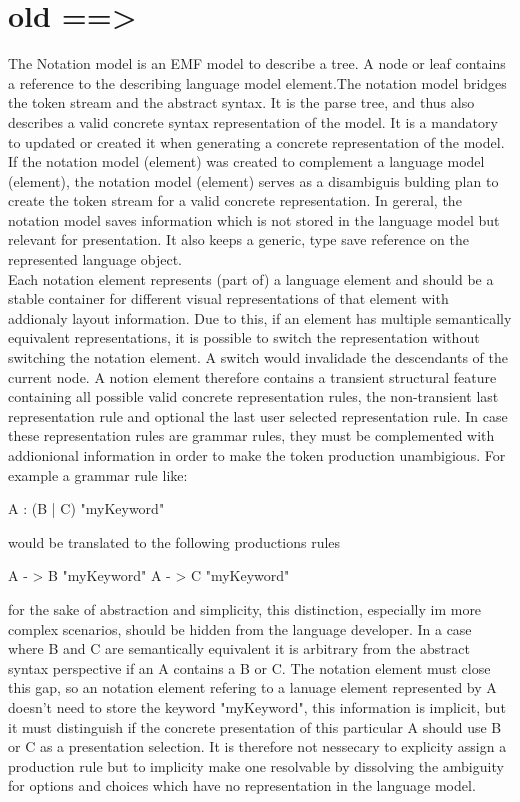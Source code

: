 \section{old ==>}
The Notation model is an EMF model to describe a tree. A node or leaf contains a reference to the describing language model element.The notation model bridges the token stream and the abstract syntax. It is the parse tree, and thus also describes a valid concrete syntax representation of the model.  It is a mandatory to updated or created it when generating a concrete representation of the model. If the notation model (element) was created to complement a language model (element), the notation model (element) serves as a disambiguis bulding plan to create the token stream for a valid concrete representation. In gereral, the notation model saves information which is not stored in the language model but relevant for presentation. It also keeps a generic, type save reference on the represented language object.\\
Each notation element represents (part of) a language element and should be a stable container for different visual representations of that element with addionaly layout information.  Due to this, if an element has multiple semantically equivalent representations, it is possible to switch the representation without switching the notation element. A switch would invalidade the descendants of the current node. A notion element therefore contains a transient structural feature containing all possible valid concrete representation rules, the non-transient last representation rule and optional the last user selected representation rule. In case these representation rules are grammar rules, they must be complemented with addionional information in order to make the token production unambigious. For example a grammar rule like:
\begin{xtxt}
A : (B | C) "myKeyword"
\end{xtxt}
would be translated to the following productions rules 
\begin{xtxt}
A - > B "myKeyword"
A - > C "myKeyword"
\end{xtxt}
for the sake of abstraction and simplicity, this distinction, especially im more complex scenarios, should be hidden from the language developer. In a case where B and C are semantically equivalent  it is arbitrary from the abstract syntax perspective if an A contains a B or C. The notation element must close this gap, so an notation element refering to a lanuage element represented by A doesn't need to store the keyword "myKeyword", this information is implicit, but it must distinguish if the concrete presentation of this particular A should use B or C as a presentation selection. It is therefore not nessecary to explicity assign  a production rule but to implicity make one resolvable by dissolving the ambiguity for options and choices which have no representation in the language model. \\
